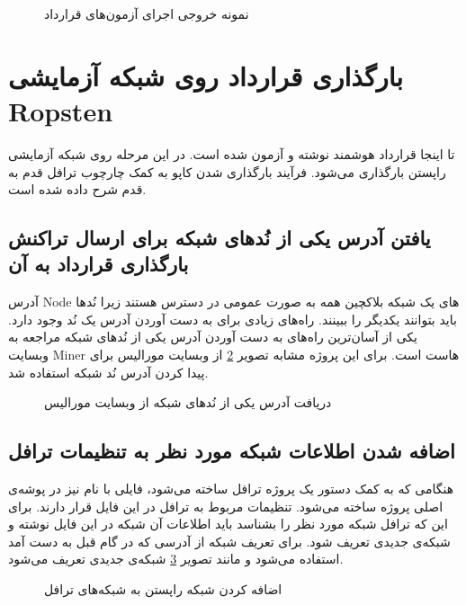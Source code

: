 \begin{figure}
\centerline{}
\caption{نمونه خروجی اجرای آزمون‌های قرارداد}
\label{fig:test-output}
\end{figure}

\section{بارگذاری قرارداد روی شبکه آزمایشی \gls{Ropsten}}
تا اینجا قرارداد هوشمند نوشته و آزمون شده است.
در این مرحله روی شبکه آزمایشی راپستن بارگذاری می‌شود.
فرآیند بارگذاری شدن کاپو به کمک چارچوب ترافل قدم به قدم شرح داده شده است.

\subsection{یافتن آدرس یکی از نُد‌های شبکه برای ارسال تراکنش بارگذاری قرارداد به آن}
آدرس
\gls{Node}
های یک شبکه بلاکچین همه به صورت عمومی در دسترس هستند زیرا نُدها باید بتوانند یکدیگر را ببینند.
راه‌های زیادی برای به دست آوردن آدرس یک نُد وجود دارد.
یکی از آسان‌ترین راه‌های به دست آوردن آدرس یکی از نُد‌های شبکه مراجعه به وبسایت
\gls{Miner}
هاست است.
برای این پروژه مشابه تصویر
\ref{fig:moralis}
از وبسایت مورالیس
برای پیدا کردن آدرس نُد شبکه استفاده شد.

\begin{figure}
\centerline{}
\caption{دریافت آدرس یکی از نُد‌های شبکه از وبسایت مورالیس}
\label{fig:moralis}
\end{figure}

\subsection{اضافه شدن اطلاعات شبکه مورد نظر به تنظیمات ترافل}
هنگامی که به کمک دستور
یک پروژه ترافل ساخته می‌شود، فایلی با نام
نیز در پوشه‌ی اصلی پروژه ساخته می‌شود.
تنظیمات مربوط به ترافل در این فایل قرار دارند.
برای این که ترافل شبکه مورد نظر را بشناسد باید اطلاعات آن شبکه در این فایل نوشته و شبکه‌ی جدیدی تعریف شود.
برای تعریف شبکه از آدرسی که در گام قبل به دست آمد استفاده می‌شود و مانند تصویر
\ref{fig:network-config}
شبکه‌ی جدیدی تعریف می‌شود.

\begin{figure}
\centerline{}
\caption{اضافه کردن شبکه راپستن به شبکه‌های ترافل}
\label{fig:network-config}
\end{figure}


